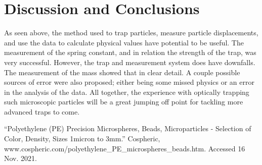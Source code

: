 \documentclass[12pt]{article}
\begin{document}
\section{Discussion and Conclusions}
As seen above, the method used to trap particles, measure particle displacements, and use the data to calculate physical values have potential to be useful. The measurement of the spring constant, and in relation the strength of the trap, was very successful. However, the trap and measurement system does have downfalls. The measurement of the mass showed that in clear detail. A couple possible sources of error were also proposed; either being some missed physics or an error in the analysis of the data. All together, the experience with optically trapping such microscopic particles will be a great jumping off point for tackling more advanced traps to come. 





\begin{thebibliography}{1}


 “Polyethylene (PE) Precision Microspheres, Beads, Microparticles - Selection of Color, Density, Sizes 1micron to 3mm.” Cospheric, www.cospheric.com/polyethylene\_PE\_microspheres\_beads.htm. Accessed 16 Nov. 2021.

\end{thebibliography}
\end{document}
